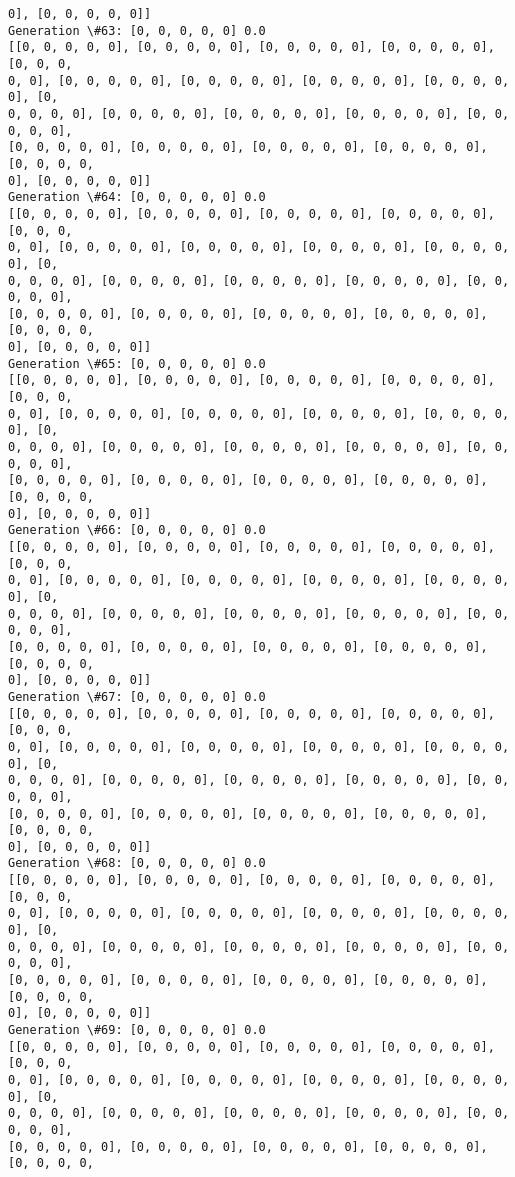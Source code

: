 \documentclass[11pt]{article}
\begin{document}
\begin{Verbatim}[commandchars=\\\{\}]
0], [0, 0, 0, 0, 0]]
Generation \#63: [0, 0, 0, 0, 0] 0.0
[[0, 0, 0, 0, 0], [0, 0, 0, 0, 0], [0, 0, 0, 0, 0], [0, 0, 0, 0, 0], [0, 0, 0,
0, 0], [0, 0, 0, 0, 0], [0, 0, 0, 0, 0], [0, 0, 0, 0, 0], [0, 0, 0, 0, 0], [0,
0, 0, 0, 0], [0, 0, 0, 0, 0], [0, 0, 0, 0, 0], [0, 0, 0, 0, 0], [0, 0, 0, 0, 0],
[0, 0, 0, 0, 0], [0, 0, 0, 0, 0], [0, 0, 0, 0, 0], [0, 0, 0, 0, 0], [0, 0, 0, 0,
0], [0, 0, 0, 0, 0]]
Generation \#64: [0, 0, 0, 0, 0] 0.0
[[0, 0, 0, 0, 0], [0, 0, 0, 0, 0], [0, 0, 0, 0, 0], [0, 0, 0, 0, 0], [0, 0, 0,
0, 0], [0, 0, 0, 0, 0], [0, 0, 0, 0, 0], [0, 0, 0, 0, 0], [0, 0, 0, 0, 0], [0,
0, 0, 0, 0], [0, 0, 0, 0, 0], [0, 0, 0, 0, 0], [0, 0, 0, 0, 0], [0, 0, 0, 0, 0],
[0, 0, 0, 0, 0], [0, 0, 0, 0, 0], [0, 0, 0, 0, 0], [0, 0, 0, 0, 0], [0, 0, 0, 0,
0], [0, 0, 0, 0, 0]]
Generation \#65: [0, 0, 0, 0, 0] 0.0
[[0, 0, 0, 0, 0], [0, 0, 0, 0, 0], [0, 0, 0, 0, 0], [0, 0, 0, 0, 0], [0, 0, 0,
0, 0], [0, 0, 0, 0, 0], [0, 0, 0, 0, 0], [0, 0, 0, 0, 0], [0, 0, 0, 0, 0], [0,
0, 0, 0, 0], [0, 0, 0, 0, 0], [0, 0, 0, 0, 0], [0, 0, 0, 0, 0], [0, 0, 0, 0, 0],
[0, 0, 0, 0, 0], [0, 0, 0, 0, 0], [0, 0, 0, 0, 0], [0, 0, 0, 0, 0], [0, 0, 0, 0,
0], [0, 0, 0, 0, 0]]
Generation \#66: [0, 0, 0, 0, 0] 0.0
[[0, 0, 0, 0, 0], [0, 0, 0, 0, 0], [0, 0, 0, 0, 0], [0, 0, 0, 0, 0], [0, 0, 0,
0, 0], [0, 0, 0, 0, 0], [0, 0, 0, 0, 0], [0, 0, 0, 0, 0], [0, 0, 0, 0, 0], [0,
0, 0, 0, 0], [0, 0, 0, 0, 0], [0, 0, 0, 0, 0], [0, 0, 0, 0, 0], [0, 0, 0, 0, 0],
[0, 0, 0, 0, 0], [0, 0, 0, 0, 0], [0, 0, 0, 0, 0], [0, 0, 0, 0, 0], [0, 0, 0, 0,
0], [0, 0, 0, 0, 0]]
Generation \#67: [0, 0, 0, 0, 0] 0.0
[[0, 0, 0, 0, 0], [0, 0, 0, 0, 0], [0, 0, 0, 0, 0], [0, 0, 0, 0, 0], [0, 0, 0,
0, 0], [0, 0, 0, 0, 0], [0, 0, 0, 0, 0], [0, 0, 0, 0, 0], [0, 0, 0, 0, 0], [0,
0, 0, 0, 0], [0, 0, 0, 0, 0], [0, 0, 0, 0, 0], [0, 0, 0, 0, 0], [0, 0, 0, 0, 0],
[0, 0, 0, 0, 0], [0, 0, 0, 0, 0], [0, 0, 0, 0, 0], [0, 0, 0, 0, 0], [0, 0, 0, 0,
0], [0, 0, 0, 0, 0]]
Generation \#68: [0, 0, 0, 0, 0] 0.0
[[0, 0, 0, 0, 0], [0, 0, 0, 0, 0], [0, 0, 0, 0, 0], [0, 0, 0, 0, 0], [0, 0, 0,
0, 0], [0, 0, 0, 0, 0], [0, 0, 0, 0, 0], [0, 0, 0, 0, 0], [0, 0, 0, 0, 0], [0,
0, 0, 0, 0], [0, 0, 0, 0, 0], [0, 0, 0, 0, 0], [0, 0, 0, 0, 0], [0, 0, 0, 0, 0],
[0, 0, 0, 0, 0], [0, 0, 0, 0, 0], [0, 0, 0, 0, 0], [0, 0, 0, 0, 0], [0, 0, 0, 0,
0], [0, 0, 0, 0, 0]]
Generation \#69: [0, 0, 0, 0, 0] 0.0
[[0, 0, 0, 0, 0], [0, 0, 0, 0, 0], [0, 0, 0, 0, 0], [0, 0, 0, 0, 0], [0, 0, 0,
0, 0], [0, 0, 0, 0, 0], [0, 0, 0, 0, 0], [0, 0, 0, 0, 0], [0, 0, 0, 0, 0], [0,
0, 0, 0, 0], [0, 0, 0, 0, 0], [0, 0, 0, 0, 0], [0, 0, 0, 0, 0], [0, 0, 0, 0, 0],
[0, 0, 0, 0, 0], [0, 0, 0, 0, 0], [0, 0, 0, 0, 0], [0, 0, 0, 0, 0], [0, 0, 0, 0,

\end{Verbatim}
\end{document}
